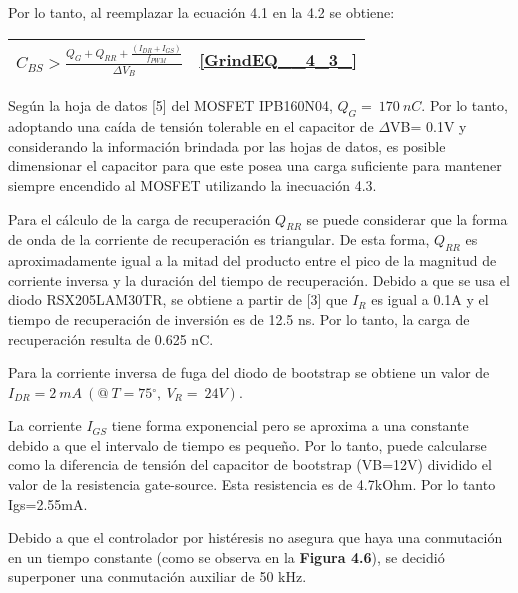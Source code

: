 \documentclass{article} %
\begin{document}
\noindent 

\noindent 

\noindent Por lo tanto, al reemplazar la ecuaci\'{o}n 4.1 en la 4.2 se obtiene:

\noindent 

\begin{tabular}{|p{3.9in}|p{0.4in}|} \hline 
$C_{BS}>\frac{Q_G+Q_{RR}+\frac{(I_{DR}+I_{GS})}{f_{PWM}}}{{\mathit{\Delta}V}_B}$ & \eqref{GrindEQ__4_3_} \\ \hline 
\end{tabular}



\noindent Seg\'{u}n la hoja de datos [5] del MOSFET IPB160N04, $Q_G=\ 170\ nC$. Por lo tanto, adoptando una ca\'{i}da de tensi\'{o}n tolerable en el capacitor de $\Delta$VB= 0.1V y considerando la informaci\'{o}n brindada por las hojas de datos, es posible dimensionar el capacitor para que este posea una carga suficiente para mantener siempre encendido al MOSFET utilizando la inecuaci\'{o}n 4.3.

\noindent 

\noindent Para el c\'{a}lculo de la carga de recuperaci\'{o}n $Q_{RR}$ se puede considerar que la forma de onda de la corriente de recuperaci\'{o}n es triangular. De esta forma,  $Q_{RR}$ es aproximadamente igual a la mitad del producto entre el pico de la magnitud de corriente inversa y la duraci\'{o}n del tiempo de recuperaci\'{o}n.  Debido a que se usa el diodo RSX205LAM30TR, se obtiene a partir de [3] que  $I_R$ es igual a 0.1A  y  el tiempo de recuperaci\'{o}n de inversi\'{o}n es de 12.5 ns. Por lo tanto, la carga de recuperaci\'{o}n resulta de 0.625 nC.

\noindent 

\noindent Para la corriente inversa de fuga del diodo de bootstrap se obtiene un valor de $I_{DR}=2\ mA\ (@\ T=75{}^\circ ,\ V_R=\ 24V)$.

\noindent 

\noindent La corriente $I_{GS}$ tiene forma exponencial pero se aproxima a una constante debido a que el intervalo de tiempo es peque\~{n}o. Por lo tanto, puede calcularse como la diferencia de tensi\'{o}n del capacitor de bootstrap (VB=12V) dividido el valor de la resistencia gate-source. Esta resistencia es de 4.7kOhm. Por lo tanto Igs=2.55mA. 

\noindent 

\noindent Debido a que el controlador por hist\'{e}resis no asegura que haya una conmutaci\'{o}n en un tiempo constante (como se observa en la \textbf{Figura 4.6}), se decidi\'{o} superponer una conmutaci\'{o}n auxiliar de 50 kHz. 
\end{document}
